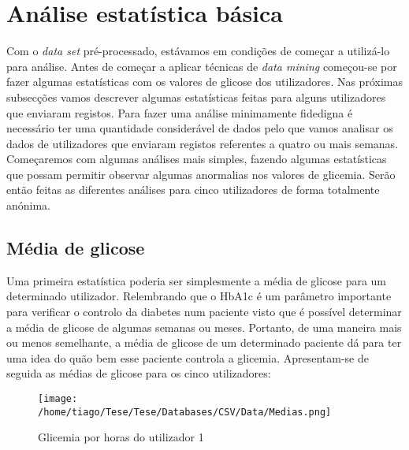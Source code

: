 \section{Análise estatística básica}

Com o \textit{data set} pré-processado, estávamos em condições de começar a utilizá-lo para análise. Antes de começar a aplicar técnicas de \textit{data mining} começou-se por fazer algumas estatísticas com os valores de glicose dos utilizadores. Nas próximas subsecções vamos descrever algumas estatísticas feitas para alguns utilizadores que enviaram registos. Para fazer uma análise minimamente fidedigna é necessário ter uma quantidade considerável de dados pelo que vamos analisar os dados de utilizadores que enviaram registos referentes a quatro ou mais semanas. Começaremos com algumas análises mais simples, fazendo algumas estatísticas que possam permitir observar algumas anormalias nos valores de glicemia. Serão então feitas as diferentes análises para cinco utilizadores de forma totalmente anónima.


\subsection{Média de glicose}

Uma primeira estatística poderia ser simplesmente a média de glicose para um determinado utilizador. Relembrando que o HbA1c é um parâmetro importante para verificar o controlo da diabetes num paciente visto que é possível determinar a média de glicose de algumas semanas ou meses. Portanto, de uma maneira mais ou menos semelhante, a média de glicose de um determinado paciente dá para ter uma idea do quão bem esse paciente controla a glicemia. Apresentam-se de seguida as médias de glicose para os cinco utilizadores:

\begin{figure}[H]
\centering
\texttt{[image: /home/tiago/Tese/Tese/Databases/CSV/Data/Medias.png]}
\caption{Glicemia por horas do utilizador 1}
\end{figure}

